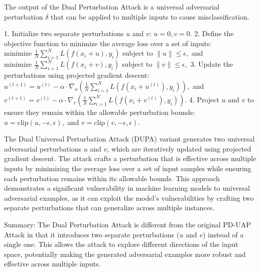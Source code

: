 

The output of the Dual Perturbation Attack is a universal adversarial perturbation $\delta$ that can be applied to multiple inputs to cause misclassification.

1. Initialize two separate perturbations $u$ and $v$:
   $
   u = 0,
   v = 0.
   $
2. Define the objective function to minimize the average loss over a set of inputs:
   $
   \text{minimize } \frac{1}{N} \sum_{i=1}^{N} L(f(x_i + u), y_i) \text{ subject to } \|u\| \leq \epsilon,
   $
   and
   $
   \text{minimize } \frac{1}{N} \sum_{i=1}^{N} L(f(x_i + v), y_i) \text{ subject to } \|v\| \leq \epsilon,
   $
3. Update the perturbations using projected gradient descent:
   $
   u^{(t+1)} = u^{(t)} - \alpha \cdot \nabla_{u} \left( \frac{1}{N} \sum_{i=1}^{N} L(f(x_i + u^{(t)}), y_i) \right),
   $
   and
   $
   v^{(t+1)} = v^{(t)} - \alpha \cdot \nabla_{v} \left( \frac{1}{N} \sum_{i=1}^{N} L(f(x_i + v^{(t)}), y_i) \right).
   $
4. Project $u$ and $v$ to ensure they remain within the allowable perturbation bounds:
   $
   u = \text{clip}(u, -\epsilon, \epsilon),
   $
   and
   $
   v = \text{clip}(v, -\epsilon, \epsilon).
   $

The Dual Universal Perturbation Attack (DUPA) variant generates two universal adversarial perturbations $u$ and $v$, which are iteratively updated using projected gradient descent. The attack crafts a perturbation that is effective across multiple inputs by minimizing the average loss over a set of input samples while ensuring each perturbation remains within its allowable bounds. This approach demonstrates a significant vulnerability in machine learning models to universal adversarial examples, as it can exploit the model's vulnerabilities by crafting two separate perturbations that can generalize across multiple instances.

Summary: The Dual Perturbation Attack is different from the original PD-UAP Attack in that it introduces two separate perturbations ($u$ and $v$) instead of a single one. This allows the attack to explore different directions of the input space, potentially making the generated adversarial examples more robust and effective across multiple inputs.